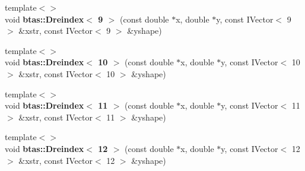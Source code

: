 \begin{DoxyCompactItemize}
\item 
{\footnotesize template$<$$>$ }\\void {\bf btas\-::\-Dreindex$<$ 9 $>$} (const double $\ast$x, double $\ast$y, const I\-Vector$<$ 9 $>$ \&xstr, const I\-Vector$<$ 9 $>$ \&yshape)
\item 
{\footnotesize template$<$$>$ }\\void {\bf btas\-::\-Dreindex$<$ 10 $>$} (const double $\ast$x, double $\ast$y, const I\-Vector$<$ 10 $>$ \&xstr, const I\-Vector$<$ 10 $>$ \&yshape)
\item 
{\footnotesize template$<$$>$ }\\void {\bf btas\-::\-Dreindex$<$ 11 $>$} (const double $\ast$x, double $\ast$y, const I\-Vector$<$ 11 $>$ \&xstr, const I\-Vector$<$ 11 $>$ \&yshape)
\item 
{\footnotesize template$<$$>$ }\\void {\bf btas\-::\-Dreindex$<$ 12 $>$} (const double $\ast$x, double $\ast$y, const I\-Vector$<$ 12 $>$ \&xstr, const I\-Vector$<$ 12 $>$ \&yshape)
\end{DoxyCompactItemize}
